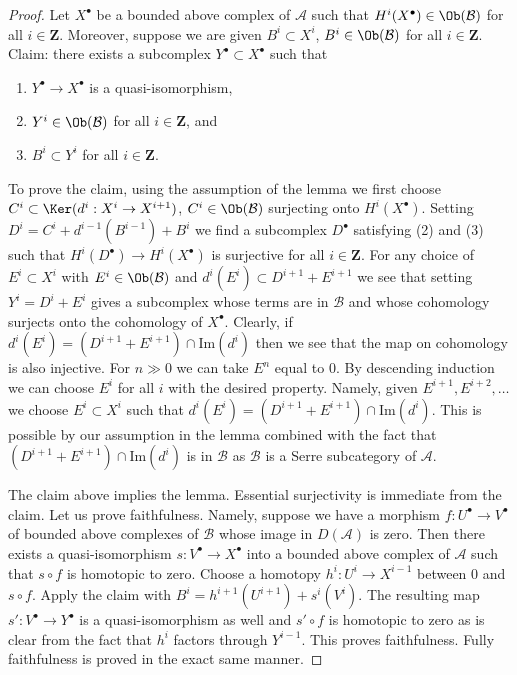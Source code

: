 \begin{proof}
Let $X^\bullet$ be a bounded above complex of $\mathcal{A}$ such that
$H^i(X^\bullet) \in \Ob(\mathcal{B})$ for all $i \in \mathbf{Z}$.
Moreover, suppose we are given $B^i \subset X^i$, $B^i \in \Ob(\mathcal{B})$
for all $i \in \mathbf{Z}$. Claim: there exists a subcomplex
$Y^\bullet \subset X^\bullet$ such that
\begin{enumerate}
\item $Y^\bullet \to X^\bullet$ is a quasi-isomorphism,
\item $Y^i \in \Ob(\mathcal{B})$ for all $i \in \mathbf{Z}$, and
\item $B^i \subset Y^i$ for all $i \in \mathbf{Z}$.
\end{enumerate}
To prove the claim, using the assumption of the lemma we first choose
$C^i \subset \Ker(d^i : X^i \to X^{i + 1})$, $C^i \in \Ob(\mathcal{B})$
surjecting onto $H^i(X^\bullet)$. Setting
$D^i = C^i + d^{i - 1}(B^{i - 1}) + B^i$ we find a subcomplex
$D^\bullet$ satisfying (2) and (3) such that
$H^i(D^\bullet) \to H^i(X^\bullet)$ is surjective for all $i \in \mathbf{Z}$.
For any choice of $E^i \subset X^i$ with $E^i \in \Ob(\mathcal{B})$ and
$d^i(E^i) \subset D^{i + 1} + E^{i + 1}$ we see that setting
$Y^i = D^i + E^i$ gives a subcomplex whose terms are in $\mathcal{B}$ and
whose cohomology surjects onto the cohomology of $X^\bullet$. Clearly, if
$d^i(E^i) = (D^{i + 1} + E^{i + 1}) \cap \text{Im}(d^i)$ then we see that
the map on cohomology is also injective. For $n \gg 0$ we can
take $E^n$ equal to $0$. By descending induction
we can choose $E^i$ for all $i$ with the desired property.
Namely, given $E^{i + 1}, E^{i + 2}, \ldots$ we choose $E^i \subset X^i$
such that $d^i(E^i) = (D^{i + 1} + E^{i + 1}) \cap \text{Im}(d^i)$.
This is possible by our assumption in the lemma combined with
the fact that $(D^{i + 1} + E^{i + 1}) \cap \text{Im}(d^i)$ is
in $\mathcal{B}$ as $\mathcal{B}$ is a Serre subcategory of $\mathcal{A}$.

\medskip\noindent
The claim above implies the lemma. Essential surjectivity is immediate
from the claim. Let us prove faithfulness. Namely, suppose we have
a morphism $f : U^\bullet \to V^\bullet$ of bounded above complexes
of $\mathcal{B}$ whose image in $D(\mathcal{A})$ is zero. Then
there exists a quasi-isomorphism $s : V^\bullet \to X^\bullet$
into a bounded above complex of $\mathcal{A}$ such that
$s \circ f$ is homotopic to zero. Choose a homotopy
$h^i : U^i \to X^{i - 1}$ between $0$ and $s \circ f$.
Apply the claim with $B^i = h^{i + 1}(U^{i + 1}) + s^i(V^i)$.
The resulting map $s' : V^\bullet \to Y^\bullet$
is a quasi-isomorphism as well and $s' \circ f$ is homotopic
to zero as is clear from the fact that $h^i$ factors through $Y^{i - 1}$.
This proves faithfulness. Fully faithfulness is proved in the
exact same manner.
\end{proof}





